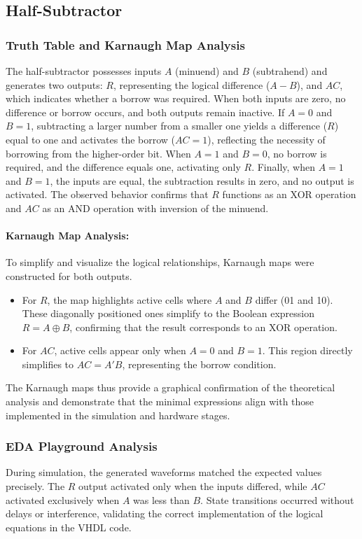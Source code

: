 \documentclass[12pt]{article}  %
\begin{document}
\subsection{Half-Subtractor}

\subsubsection{Truth Table and Karnaugh Map Analysis}
The half-subtractor possesses inputs $A$ (minuend) and $B$
(subtrahend) and generates two outputs: $R$, representing the logical
difference ($A-B$), and $AC$, which indicates whether a borrow was
required. When both inputs are zero, no difference or borrow occurs, and both
outputs remain inactive. If $A = 0$ and $B = 1$, subtracting a larger number from a
smaller one yields a difference ($R$) equal to one and activates the borrow ($AC = 1$), 
reflecting the necessity of borrowing from the higher-order bit. When $A = 1$
and $B = 0$, no borrow is required, and the difference equals one, activating
only $R$. Finally, when $A = 1$ and $B = 1$, the inputs are equal, the subtraction
results in zero, and no output is activated. The observed behavior confirms
that $R$ functions as an XOR operation and $AC$ as an AND operation with inversion
of the minuend.

\paragraph{Karnaugh Map Analysis:}
To simplify and visualize the logical relationships, Karnaugh maps were
constructed for both outputs.
\begin{itemize}
    \item For $R$, the map highlights active cells where $A$ and $B$
        differ (01 and 10). These diagonally positioned ones simplify to the
        Boolean expression $R = A \oplus B$, confirming that the result
        corresponds to an XOR operation.
    \item For $AC$, active cells appear only when $A = 0$ and $B = 1$.
        This region directly simplifies to $AC = A'B$, representing the
        borrow condition.
\end{itemize}
The Karnaugh maps thus provide a graphical confirmation of the theoretical
analysis and demonstrate that the minimal expressions align with those
implemented in the simulation and hardware stages.

\subsubsection{EDA Playground Analysis}
During simulation, the generated waveforms matched the
expected values precisely. The $R$ output activated only when the inputs
differed, while $AC$ activated exclusively when $A$ was less than $B$. State
transitions occurred without delays or interference, validating the correct
implementation of the logical equations in the VHDL code.
\end{document}
